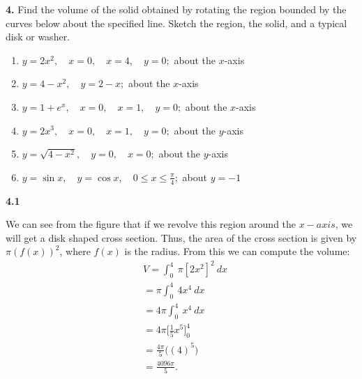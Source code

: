 \documentclass{report}
\begin{document}
    \pagebreak \bigbreak \noindent 
    \begin{mdframed}
        \textbf{4.} Find the volume of the solid obtained by rotating the region bounded by the curves below about the specified line. Sketch the region, the solid, and a typical disk or washer.
        \begin{enumerate}
            \item \( y = 2x^2, \quad x = 0, \quad x = 4, \quad y = 0; \) about the \(x\)-axis
            \item \( y = 4 - x^2, \quad y = 2 - x; \) about the \(x\)-axis
            \item \( y = 1 + e^x, \quad x = 0, \quad x = 1, \quad y = 0; \) about the \(x\)-axis
            \item \( y = 2x^3, \quad x = 0, \quad x = 1, \quad y = 0; \) about the \(y\)-axis
            \item \( y = \sqrt{4 - x^2}, \quad y = 0, \quad x = 0; \) about the \(y\)-axis
            \item \( y = \sin x, \quad y = \cos x, \quad 0 \leq x \leq \frac{\pi}{4}; \) about \(y = -1\)
        \end{enumerate}
    \end{mdframed}
    \bigbreak \noindent 
    \textbf{4.1}
    \bigbreak \noindent 
    \begin{minipage}[]{0.47\textwidth}
    \end{minipage}
    \begin{minipage}[]{0.47\textwidth}
        We can see from the figure that if we revolve this region around the $x-axis$, we will get a disk shaped cross section. Thus, the area of the cross section is given by $\pi(f(x))^{2}$, where $f(x)$ is the radius.
        \bigbreak \noindent 
        From this we can compute the volume:
        \begin{align*}
            &V = \int_{0}^{4}\ \pi[2x^{2}]^{2}\ dx \\
            &= \pi \int_{0}^{4}\ 4x^{4}\ dx  \\
            &= 4\pi \int_{0}^{4}\ x^{4}\ dx  \\
            &= 4\pi\bigg[\frac{1}{5}x^{5}\bigg]_{0}^{4} \\
            &= \frac{4\pi}{5}\bigg((4)^{5}\bigg) \\
            &= \frac{4096\pi}{5}
        .\end{align*}
    \end{minipage}
\end{document}

